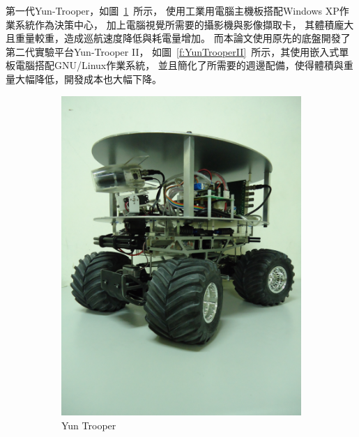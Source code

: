 第一代Yun-Trooper，如圖~\ref{f:YunTrooperI}~所示，
使用工業用電腦主機板搭配Windows XP作業系統作為決策中心，
加上電腦視覺所需要的攝影機與影像擷取卡，
其體積龐大且重量較重，造成巡航速度降低與耗電量增加。
而本論文使用原先的底盤開發了第二代實驗平台Yun-Trooper II，
如圖~\ref{f:YunTrooperII}~所示，其使用嵌入式單板電腦搭配GNU/Linux作業系統，
並且簡化了所需要的週邊配備，使得體積與重量大幅降低，開發成本也大幅下降。
\begin{figure}[h!]
	\centering
	\begin{subfigure}[b]{0.45\textwidth}
		\includegraphics[width=\textwidth]{figures/YunTrooper}
		\caption{Yun Trooper}
		\label{f:YunTrooperI}
	\end{subfigure}
	\begin{subfigure}[b]{0.45\textwidth}

\end{subfigure}
\end{figure}

